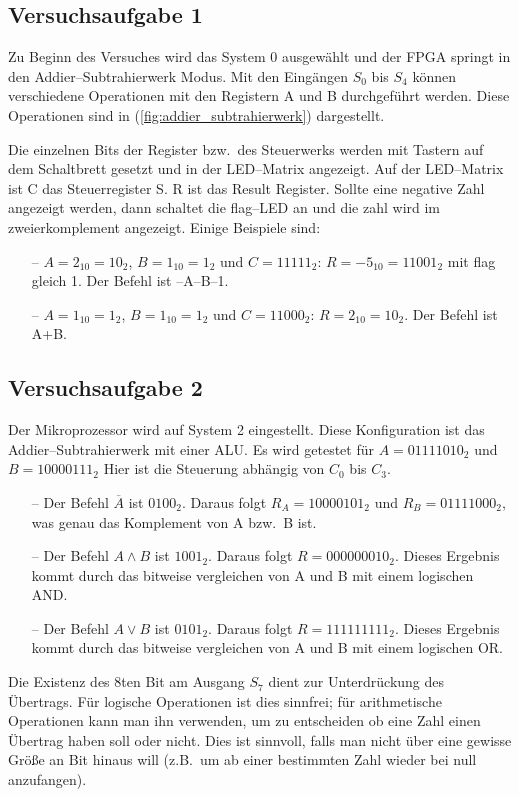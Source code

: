\documentclass[10pt]{article}
\begin{document}
\begin{multicols}{2}
	\subsection{Versuchsaufgabe 1}
	Zu Beginn des Versuches wird das System 0 ausgewählt und der FPGA springt in den Addier--Subtrahierwerk Modus.
	Mit den Eingängen $S_0$ bis $S_4$ können verschiedene Operationen mit den Registern A und B durchgeführt werden.
	Diese Operationen sind in (\ref{fig:addier_subtrahierwerk}) dargestellt.
	\par Die einzelnen Bits der Register bzw.\ des Steuerwerks werden mit Tastern auf dem Schaltbrett gesetzt und in der LED--Matrix angezeigt.
	Auf der LED--Matrix ist C das Steuerregister S.
	R ist das Result Register.
	Sollte eine negative Zahl angezeigt werden, dann schaltet die flag--LED an und die zahl wird im zweierkomplement angezeigt.
	Einige Beispiele sind:
	\begin{enumerate}
		\item[--] $A=2_{10}=10_{2}$, $B=1_{10}=1_2$ und $C=11111_{2}$: $R=-5_{10}=11001_2$ mit flag gleich 1.
		      Der Befehl ist --A--B--1.
		\item[--] $A=1_{10}=1_2$, $B=1_{10}=1_2$ und $C=11000_2$: $R=2_{10}=10_2$.
		      Der Befehl ist A+B.
	\end{enumerate}

	\subsection{Versuchsaufgabe 2}
	Der Mikroprozessor wird auf System 2 eingestellt.
	Diese Konfiguration ist das Addier--Subtrahierwerk mit einer ALU.
	Es wird getestet für $A=01111010_2$ und $B=10000111_2$
	Hier ist die Steuerung abhängig von $C_0$ bis $C_3$.
	\begin{enumerate}
		\item[--] Der Befehl $\overline{A}$ ist $0100_2$.
		      Daraus folgt $R_A=10000101_2$ und $R_B=01111000_2$, was genau das Komplement von A bzw.\ B ist.
		\item[--] Der Befehl $A\land B$ ist $1001_2$.
		      Daraus folgt $R=000000010_2$.
		      Dieses Ergebnis kommt durch das bitweise vergleichen von A und B mit einem logischen AND.
		\item[--] Der Befehl $A\lor B$ ist $0101_2$.
		      Daraus folgt $R=111111111_2$.
		      Dieses Ergebnis kommt durch das bitweise vergleichen von A und B mit einem logischen OR.
	\end{enumerate}
        Die Existenz des 8ten Bit am Ausgang $S_7$ dient zur Unterdrückung des Übertrags.
        Für logische Operationen ist dies sinnfrei; für arithmetische Operationen kann man ihn verwenden, um zu entscheiden ob eine Zahl einen Übertrag haben soll oder nicht.
        Dies ist sinnvoll, falls man nicht über eine gewisse Größe an Bit hinaus will (z.B.\ um ab einer bestimmten Zahl wieder bei null anzufangen).


\end{multicols}
\end{document}
